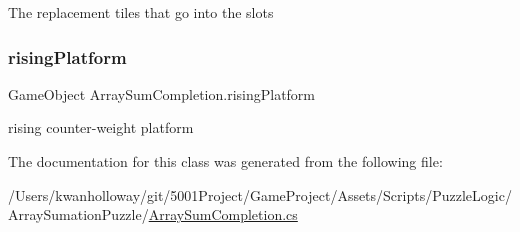 The replacement tiles that go into the slots 

\mbox{\label{class_array_sum_completion_aede79dd24168cb27103df95c78a78abf}} 
\subsubsection{\texorpdfstring{rising\+Platform}{risingPlatform}}
{\footnotesize\ttfamily Game\+Object Array\+Sum\+Completion.\+rising\+Platform}



rising counter-\/weight platform 



The documentation for this class was generated from the following file\+:\begin{DoxyCompactItemize}
\item 
/\+Users/kwanholloway/git/5001\+Project/\+Game\+Project/\+Assets/\+Scripts/\+Puzzle\+Logic/\+Array\+Sumation\+Puzzle/\hyperlink{_array_sum_completion_8cs}{Array\+Sum\+Completion.\+cs}\end{DoxyCompactItemize}
